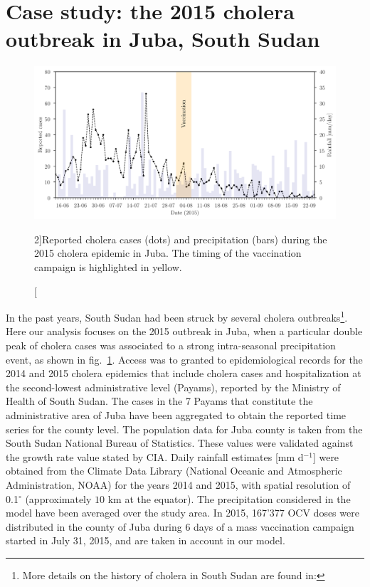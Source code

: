 \section{Case study: the 2015 cholera outbreak in Juba, South Sudan}\label{sec:data sets}
\begin{figure}\centering
  \includegraphics{fig_cholera-rainfall/Lemaitre_ACTROP_2018_42_R1_fig2.png}
  \caption[Cholera cases and precipitation during the 2015 epidemic in Juba][2\baselineskip]{Reported cholera cases (dots) and precipitation (bars) during the 2015 cholera epidemic in Juba. The timing of the vaccination campaign is highlighted in yellow.}\label{fig:report}
\end{figure}
In the past years, South Sudan had been struck by several cholera outbreaks\footnote{More details on the history of cholera in South Sudan are found in: }. Here our analysis focuses on the 2015 outbreak in Juba, when a particular double peak of cholera cases was associated to a strong intra-seasonal precipitation event, as shown in fig.~\ref{fig:report}. Access was to granted to epidemiological records for the 2014 and 2015 cholera epidemics that include cholera cases and hospitalization at the second-lowest administrative level (Payams), reported by the Ministry of Health of South Sudan. The cases in the 7 Payams that constitute the administrative area of Juba have been aggregated to obtain the reported time series for the county level. The population data for Juba county is taken from the South Sudan National Bureau of Statistics\cite{SSNBS:PopulationProjectionsSouth:2015}.
These values were validated against the growth rate value stated by CIA\cite{CIA:SouthSudan:2015}. Daily rainfall estimates [mm d$^{-1}$] were obtained from the Climate Data Library (National Oceanic and Atmospheric Administration, NOAA)\cite{IRI/LDEO:ClimateDataLibrary:2016} for the years 2014 and 2015, with spatial resolution of {0.1}$^\circ$ (approximately $10$ km at the equator). The precipitation considered in the model have been averaged over the study area. In 2015, 167'377 OCV doses were distributed in the county of Juba during 6 days of a mass vaccination campaign started in July 31, 2015\cite{Abubakar:FirstUseGlobal:2015,Azman:EffectivenessOneDose:2016,Parker:AdaptingGlobalShortage:2017}, and are taken in account in our model.

